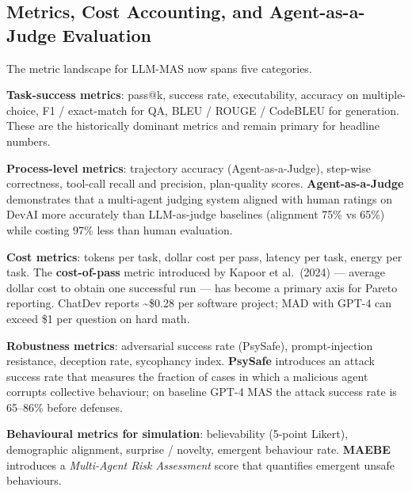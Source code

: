 \documentclass{article}
\begin{document}
\subsection{Metrics, Cost Accounting, and Agent-as-a-Judge Evaluation}\label{metrics-cost-accounting-and-agent-as-a-judge-evaluation}

The metric landscape for LLM-MAS now spans five categories.

\textbf{Task-success metrics}: pass@k, success rate, executability, accuracy on multiple-choice, F1 / exact-match for QA, BLEU / ROUGE / CodeBLEU for generation. These are the historically dominant metrics and remain primary for headline numbers.

\textbf{Process-level metrics}: trajectory accuracy (Agent-as-a-Judge), step-wise correctness, tool-call recall and precision, plan-quality scores. \textbf{Agent-as-a-Judge} \citep{zhuge20242024} demonstrates that a multi-agent judging system aligned with human ratings on DevAI more accurately than LLM-as-judge baselines (alignment 75\% vs 65\%) while costing 97\% less than human evaluation.

\textbf{Cost metrics}: tokens per task, dollar cost per pass, latency per task, energy per task. The \textbf{cost-of-pass} metric introduced by Kapoor et al.~(2024) --- average dollar cost to obtain one successful run --- has become a primary axis for Pareto reporting. ChatDev reports \textasciitilde\$0.28 per software project; MAD with GPT-4 can exceed \$1 per question on hard math.

\textbf{Robustness metrics}: adversarial success rate (PsySafe), prompt-injection resistance, deception rate, sycophancy index. \textbf{PsySafe} \citep{zhang2024psysafeacomprehens} introduces an attack success rate that measures the fraction of cases in which a malicious agent corrupts collective behaviour; on baseline GPT-4 MAS the attack success rate is 65--86\% before defenses.

\textbf{Behavioural metrics for simulation}: believability (5-point Likert), demographic alignment, surprise / novelty, emergent behaviour rate. \textbf{MAEBE} \citep{erisken2025maebemultiagenteme} introduces a \emph{Multi-Agent Risk Assessment} score that quantifies emergent unsafe behaviours.
\end{document}
